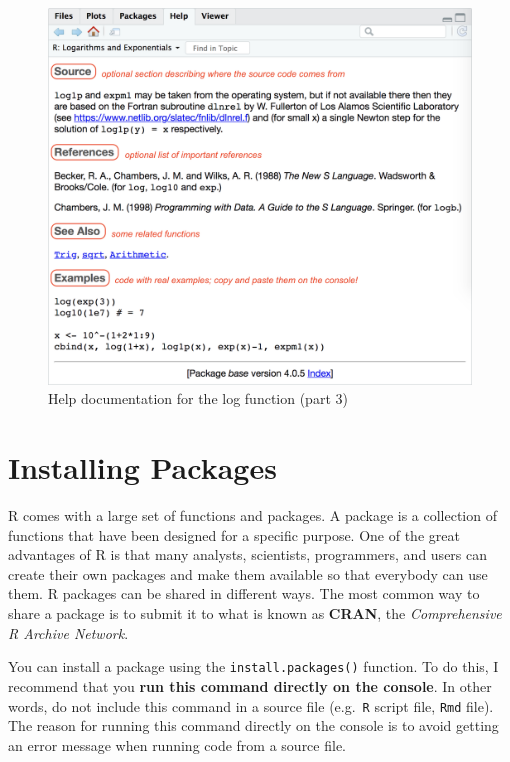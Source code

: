 \documentclass[
]{book}
\begin{document}
\begin{figure}

{\centering \includegraphics[width=0.85\linewidth]{images/rstudio/help-log-3} 

}

\caption{Help documentation for the log function (part 3)}\label{fig:unnamed-chunk-24}
\end{figure}

\hypertarget{installing-packages}{%
\section{Installing Packages}\label{installing-packages}}

R comes with a large set of functions and packages. A package is a collection
of functions that have been designed for a specific purpose. One of the great
advantages of R is that many analysts, scientists, programmers, and users
can create their own packages and make them available so that everybody can use
them. R packages can be shared in different ways. The most common way to share
a package is to submit it to what is known as \textbf{CRAN}, the
\emph{Comprehensive R Archive Network}.

You can install a package using the \texttt{install.packages()} function. To do this,
I recommend that you \textbf{run this command directly on the console}. In other
words, do not include this command in a source file (e.g.~\texttt{R} script file, \texttt{Rmd}
file). The reason for running this command directly on the console is to avoid
getting an error message when running code from a source file.
\end{document}
